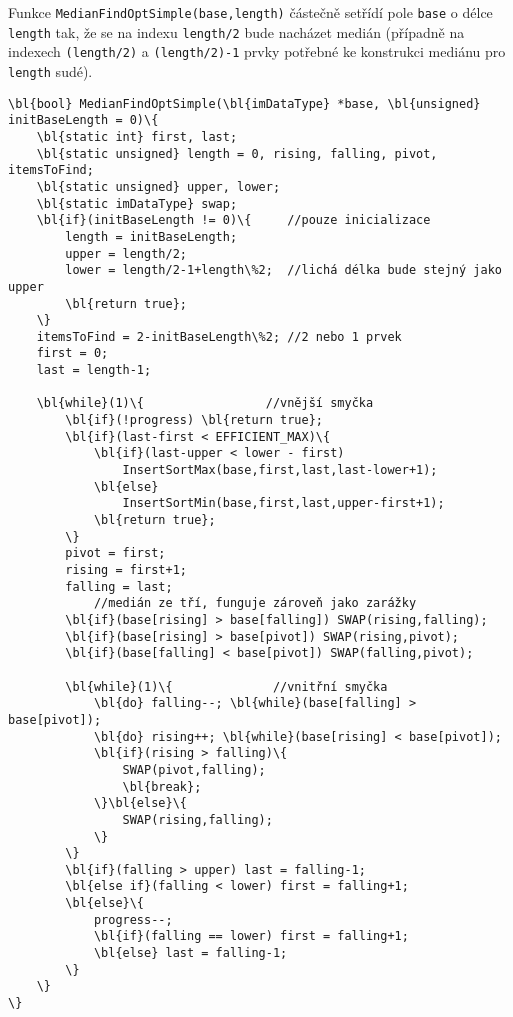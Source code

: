         Funkce {\tt MedianFindOptSimple(base,length)} částečně setřídí pole {\tt base} o délce {\tt length} tak, že se na indexu {\tt length/2} bude nacházet medián (případně na indexech {\tt (length/2)} a {\tt (length/2)-1} prvky potřebné ke konstrukci mediánu pro {\tt length} sudé).

        \begin{Verbatim}[commandchars = \\\{\}]
\bl{bool} MedianFindOptSimple(\bl{imDataType} *base, \bl{unsigned} initBaseLength = 0)\{
    \bl{static int} first, last;
    \bl{static unsigned} length = 0, rising, falling, pivot, itemsToFind;
    \bl{static unsigned} upper, lower;
    \bl{static imDataType} swap;
    \bl{if}(initBaseLength != 0)\{     //pouze inicializace
        length = initBaseLength;
        upper = length/2;
        lower = length/2-1+length\%2;  //lichá délka bude stejný jako upper
        \bl{return true};
    \}
    itemsToFind = 2-initBaseLength\%2; //2 nebo 1 prvek
    first = 0;	
    last = length-1;

    \bl{while}(1)\{                 //vnější smyčka
        \bl{if}(!progress) \bl{return true};
        \bl{if}(last-first < EFFICIENT_MAX)\{
            \bl{if}(last-upper < lower - first)
                InsertSortMax(base,first,last,last-lower+1);	
            \bl{else}
                InsertSortMin(base,first,last,upper-first+1);	
            \bl{return true};
        \}
        pivot = first;
        rising = first+1;
        falling = last;
            //medián ze tří, funguje zároveň jako zarážky
        \bl{if}(base[rising] > base[falling]) SWAP(rising,falling);
        \bl{if}(base[rising] > base[pivot]) SWAP(rising,pivot);
        \bl{if}(base[falling] < base[pivot]) SWAP(falling,pivot);

        \bl{while}(1)\{			     //vnitřní smyčka				
            \bl{do} falling--; \bl{while}(base[falling] > base[pivot]);
            \bl{do} rising++; \bl{while}(base[rising] < base[pivot]);
            \bl{if}(rising > falling)\{	
                SWAP(pivot,falling);
                \bl{break};
            \}\bl{else}\{					
                SWAP(rising,falling);
            \}
        \}
        \bl{if}(falling > upper) last = falling-1;	
        \bl{else if}(falling < lower) first = falling+1;
        \bl{else}\{
            progress--;
            \bl{if}(falling == lower) first = falling+1;
            \bl{else} last = falling-1;
        \}
    \}
\}
        \end{Verbatim}

